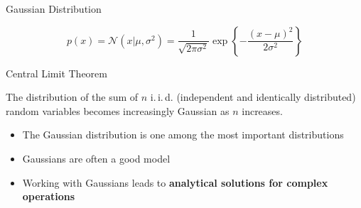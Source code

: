 \begin{frame}{Gaussian Distribution}{}\important
	
	\vspace*{-4mm}
	\begin{equation}
		p(x) = \mathcal{N}(x \vert \mu, \sigma^2) = \frac{1}{\sqrt{2 \pi \sigma^2}} \exp\left\{ -\frac{(x - \mu)^2}{2 \sigma^2} \right\}
	\end{equation}
\end{frame}


\begin{frame}{Central Limit Theorem}{}\important
	\begin{boxBlue}

		The distribution of the sum of $n$ i.\,i.\,d. (independent and identically distributed) random variables becomes increasingly Gaussian as $n$ increases.
	\end{boxBlue}

	\begin{itemize}
		\item The Gaussian distribution is one among the most important distributions
		\item Gaussians are often a good model
		\item Working with Gaussians leads to \textbf{analytical solutions for complex operations}
	\end{itemize}
\end{frame}


